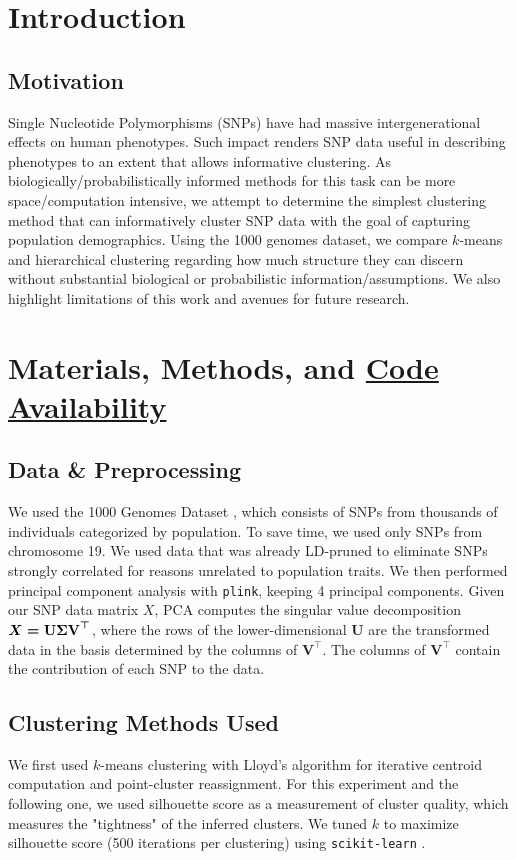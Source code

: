 \documentclass[11pt]{article}
\newcommand{\code}[1]{\texttt{#1}}
\theoremstyle{definition}
\begin{document}
\section{Introduction}\label{sec:intro}
\subsection{Motivation}
\noindent Single Nucleotide Polymorphisms (SNPs) have had massive intergenerational effects on human phenotypes. Such impact renders SNP data useful in describing phenotypes to an extent that allows informative clustering. As biologically/probabilistically informed methods for this task can be more space/computation intensive, we attempt to determine the simplest clustering method that can informatively cluster SNP data with the goal of capturing population demographics. Using the 1000 genomes dataset, we compare $k$-means and hierarchical clustering regarding how much structure they can discern without substantial biological or probabilistic information/assumptions. We also highlight limitations of this work and avenues for future research.

\section{Materials, Methods, and \href {https://github.com/0xArsi/snp-clustering.git}{Code Availability}}\label{sec:methods}
\subsection{Data \& Preprocessing}\label{subsec:data}
We used the 1000 Genomes Dataset \cite{1000genomes}, which consists of SNPs from thousands of individuals categorized by population. To save time, we used only SNPs from chromosome 19. We used data that was already LD-pruned to eliminate SNPs strongly correlated for reasons unrelated to population traits. We then performed principal component analysis with \code{plink},  keeping 4 principal components. Given our SNP data matrix $X$, PCA computes the singular value decomposition $X = \textbf{U} \boldmath{\Sigma} \textbf{V}^\top $, where the rows of the lower-dimensional $\textbf{U}$ are the transformed data in the basis determined by the columns of $\textbf{V}^\top$. The columns of $\textbf{V}^\top$ contain the contribution of each SNP to the data.
\subsection{Clustering Methods Used}
\noindent We first used $k$-means clustering with Lloyd's algorithm \cite{lloyd} for iterative centroid computation and point-cluster reassignment. For this experiment and the following one, we used silhouette score \cite{silhouette} as a measurement of cluster quality, which measures the "tightness" of the inferred clusters. We tuned $k$ to maximize silhouette score (500 iterations per clustering) using \code{scikit-learn} \cite{sklearn}.
\end{document}
